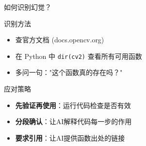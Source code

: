 \begin{frame}{如何识别幻觉？}
	\begin{block}{识别方法}
		\begin{itemize}
			\item 查官方文档 (docs.opencv.org)
			\item 在 Python 中 \texttt{dir(cv2)} 查看所有可用函数
			\item 多问一句："这个函数真的存在吗？"
		\end{itemize}
	\end{block}

	\vspace{0.3cm}

	\begin{block}{应对策略}
		\begin{itemize}
			\item \textbf{先验证再使用}：运行代码检查是否有效
			\item \textbf{分段确认}：让AI解释代码每一步的作用
			\item \textbf{要求引用}：让AI提供函数出处的链接
		\end{itemize}
	\end{block}
\end{frame}


